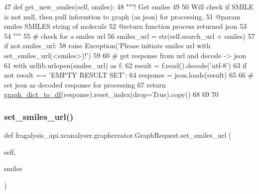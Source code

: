 \begin{DoxyCode}
47     \textcolor{keyword}{def }get\_new\_smiles(self, smiles):
48         \textcolor{stringliteral}{"""! Get smiles }
49 \textcolor{stringliteral}{}
50 \textcolor{stringliteral}{        Will check if SMILE is not null, then pull informtion to graph (as json) for processing.}
51 \textcolor{stringliteral}{        @param smiles SMILES string of molecule}
52 \textcolor{stringliteral}{        @return function process returned json }
53 \textcolor{stringliteral}{}
54 \textcolor{stringliteral}{        """}
55         \textcolor{comment}{# check for a smiles url}
56         smiles\_url = str(self.search\_url + smiles)
57         \textcolor{keywordflow}{if} \textcolor{keywordflow}{not} smiles\_url:
58             \textcolor{keywordflow}{raise} Exception(\textcolor{stringliteral}{'Please initiate smiles url with set\_smiles\_url(<smiles>)!'})
59 
60         \textcolor{comment}{# get response from url and decode -> json}
61         with urllib.urlopen(smiles\_url) \textcolor{keyword}{as} f:
62             result = f.read().decode(\textcolor{stringliteral}{'utf-8'})
63             \textcolor{keywordflow}{if} \textcolor{keywordflow}{not} result == \textcolor{stringliteral}{'EMPTY RESULT SET'}:
64                 response = json.loads(result)
65 
66                 \textcolor{comment}{# set json as decoded response for processing}
67                 \textcolor{keywordflow}{return} \hyperlink{namespacefragalysis__api_1_1xcanalyser_1_1graphcreator_a029a9d7dda209fb27d4268599330e8d3}{graph\_dict\_to\_df}(response).reset\_index(drop=\textcolor{keyword}{True}).copy()
68 
69 
70 
\end{DoxyCode}
\mbox{\label{classfragalysis__api_1_1xcanalyser_1_1graphcreator_1_1_graph_request_ac47f4baba7c0cdefd43bb0c7e17646c9}} 
\subsubsection{\texorpdfstring{set\+\_\+smiles\+\_\+url()}{set\_smiles\_url()}}
{\footnotesize\ttfamily def fragalysis\+\_\+api.\+xcanalyser.\+graphcreator.\+Graph\+Request.\+set\+\_\+smiles\+\_\+url (\begin{DoxyParamCaption}\item[{}]{self,  }\item[{}]{smiles }\end{DoxyParamCaption})}



